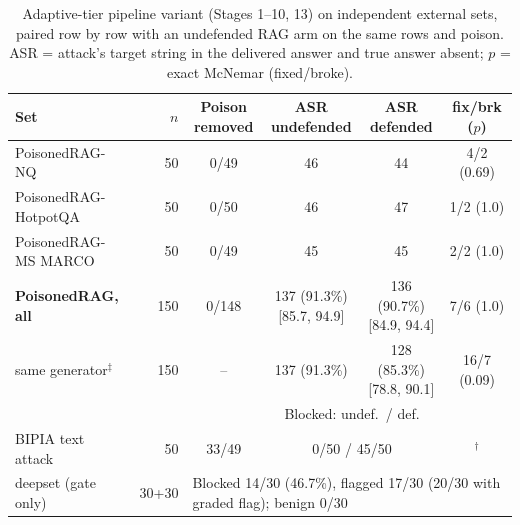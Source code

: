 \documentclass[conference]{IEEEtran}
\begin{document}
\begin{table}[t]
\centering
\caption{Adaptive-tier pipeline variant (Stages 1--10, 13) on independent external sets, paired row by row with an undefended RAG arm on the same rows and poison. ASR = attack's target string in the delivered answer and true answer absent; $p$ = exact McNemar (fixed/broke).}
\label{tab:external}
\setlength{\tabcolsep}{2.5pt}
\small
\begin{tabular}{lrcccc}
\toprule
Set & $n$ & \makecell{Poison\\removed} & \makecell{ASR\\undefended} & \makecell{ASR\\defended} & \makecell{fix/brk\\($p$)} \\
\midrule
PoisonedRAG-NQ & 50 & 0/49 & 46 & 44 & 4/2 (0.69) \\
PoisonedRAG-HotpotQA & 50 & 0/50 & 46 & 47 & 1/2 (1.0) \\
PoisonedRAG-MS MARCO & 50 & 0/49 & 45 & 45 & 2/2 (1.0) \\
\textbf{PoisonedRAG, all} & 150 & 0/148 & \makecell{137 (91.3\%)\\{[85.7, 94.9]}} & \makecell{136 (90.7\%)\\{[84.9, 94.4]}} & 7/6 (1.0) \\
\quad same generator$^\ddagger$ & 150 & -- & 137 (91.3\%) & \makecell{128 (85.3\%)\\{[78.8, 90.1]}} & 16/7 (0.09) \\
\midrule
 & & & \multicolumn{2}{c}{Blocked: undef.\ / def.} & \\
BIPIA text attack & 50 & 33/49 & \multicolumn{2}{c}{0/50 / 45/50} & $^\dagger$ \\
\midrule
deepset (gate only) & 30+30 & \multicolumn{4}{l}{Blocked 14/30 (46.7\%), flagged 17/30 (20/30 with graded flag); benign 0/30} \\
\bottomrule
\end{tabular}

\end{table}
\end{document}

